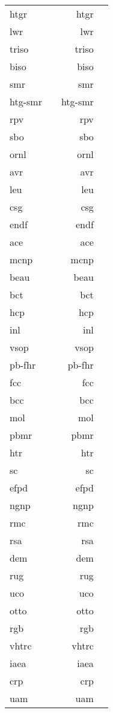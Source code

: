 \begin{longtable}{p{25mm} p{50mm} rp{75mm}}
\acrshort{htgr} & & \acrlong{htgr} \\
\acrshort{lwr} & & \acrlong{lwr} \\
\acrshort{triso} & & \acrlong{triso} \\
\acrshort{biso} & & \acrlong{biso} \\
\acrshort{smr} & & \acrlong{smr} \\
\acrshort{htg-smr} & & \acrlong{htg-smr} \\
\acrshort{rpv} & & \acrlong{rpv} \\
\acrshort{sbo} & & \acrlong{sbo} \\
\acrshort{ornl} & & \acrlong{ornl} \\
\acrshort{avr} & & \acrlong{avr} \\
\acrshort{leu} & & \acrlong{leu} \\
\acrshort{csg} & & \acrlong{csg} \\
\acrshort{endf} & & \acrlong{endf} \\
\acrshort{ace} & & \acrlong{ace} \\
\acrshort{mcnp} & & \acrlong{mcnp} \\
\acrshort{beau} & & \acrlong{beau} \\
\acrshort{bct} & & \acrlong{bct} \\
\acrshort{hcp} & & \acrlong{hcp} \\
\acrshort{inl} & & \acrlong{inl} \\
\acrshort{vsop} & & \acrlong{vsop} \\
\acrshort{pb-fhr} & & \acrlong{pb-fhr} \\
\acrshort{fcc} & & \acrlong{fcc} \\
\acrshort{bcc} & & \acrlong{bcc} \\
\acrshort{mol} & & \acrlong{mol} \\
\acrshort{pbmr} & & \acrlong{pbmr} \\
\acrshort{htr} & & \acrlong{htr} \\
\acrshort{sc} & & \acrlong{sc} \\
\acrshort{efpd} & & \acrlong{efpd} \\
\acrshort{ngnp} & & \acrlong{ngnp} \\
\acrshort{rmc} & & \acrlong{rmc} \\
\acrshort{rsa} & & \acrlong{rsa} \\
\acrshort{dem} & & \acrlong{dem} \\
\acrshort{rug} & & \acrlong{rug} \\
\acrshort{uco} & & \acrlong{uco} \\
\acrshort{otto} & & \acrlong{otto} \\
\acrshort{rgb} & & \acrlong{rgb} \\
\acrshort{vhtrc} & & \acrlong{vhtrc} \\
\acrshort{iaea} & & \acrlong{iaea} \\
\acrshort{crp} & & \acrlong{crp} \\
\acrshort{uam} & & \acrlong{uam}
\end{longtable}